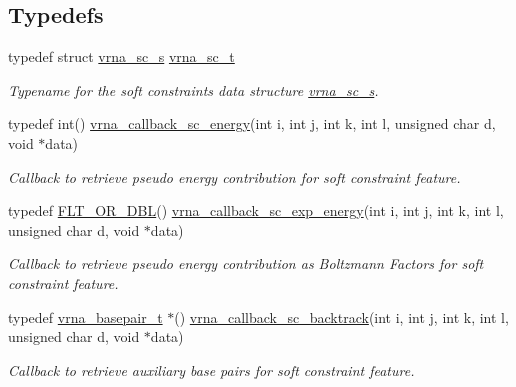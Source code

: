 \subsection*{Typedefs}
\begin{DoxyCompactItemize}
\item 
\mbox{\label{group__soft__constraints_ga75401ce219ef8dbcceb672db82d434c6}} 
typedef struct \mbox{\hyperlink{group__soft__constraints_structvrna__sc__s}{vrna\+\_\+sc\+\_\+s}} \mbox{\hyperlink{group__soft__constraints_ga75401ce219ef8dbcceb672db82d434c6}{vrna\+\_\+sc\+\_\+t}}
\begin{DoxyCompactList}\small\item\em Typename for the soft constraints data structure \mbox{\hyperlink{group__soft__constraints_structvrna__sc__s}{vrna\+\_\+sc\+\_\+s}}. \end{DoxyCompactList}\item 
typedef int() \mbox{\hyperlink{group__soft__constraints_ga88a266695d9e25cc12114dceb7b4565e}{vrna\+\_\+callback\+\_\+sc\+\_\+energy}}(int i, int j, int k, int l, unsigned char d, void $\ast$data)
\begin{DoxyCompactList}\small\item\em Callback to retrieve pseudo energy contribution for soft constraint feature. \end{DoxyCompactList}\item 
typedef \mbox{\hyperlink{group__data__structures_ga31125aeace516926bf7f251f759b6126}{F\+L\+T\+\_\+\+O\+R\+\_\+\+D\+BL}}() \mbox{\hyperlink{group__soft__constraints_ga4099978d410513edeeff8f3db13144c5}{vrna\+\_\+callback\+\_\+sc\+\_\+exp\+\_\+energy}}(int i, int j, int k, int l, unsigned char d, void $\ast$data)
\begin{DoxyCompactList}\small\item\em Callback to retrieve pseudo energy contribution as Boltzmann Factors for soft constraint feature. \end{DoxyCompactList}\item 
typedef \mbox{\hyperlink{group__data__structures_gac8c5669d3fb813cacf506489689305ce}{vrna\+\_\+basepair\+\_\+t}} $\ast$() \mbox{\hyperlink{group__soft__constraints_gaeb6448da6c593d4c489c7fbadcb99499}{vrna\+\_\+callback\+\_\+sc\+\_\+backtrack}}(int i, int j, int k, int l, unsigned char d, void $\ast$data)
\begin{DoxyCompactList}\small\item\em Callback to retrieve auxiliary base pairs for soft constraint feature. \end{DoxyCompactList}\end{DoxyCompactItemize}
